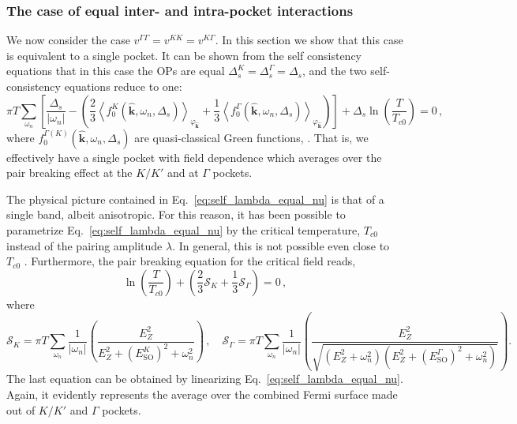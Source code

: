\documentclass[showpacs,superscriptaddress,onecolumn,prb]{revtex4}
\begin{document}
\subsubsection{The case of equal inter- and intra-pocket interactions} \label{sec:equal_amp}

We now consider the case $v^{\Gamma\Gamma}=v^{KK}=v^{K\Gamma}$. 
In this section we show that this case is equivalent to a single pocket. 
It can be shown from the self consistency equations that in this case the OPs are equal $\Delta_{s}^{K}=\Delta_{s}^{\Gamma}=\Delta_{s}$,
and the two self-consistency equations reduce to one:
\begin{equation}
\label{eq:self_lambda_equal_nu}
\pi T\underset{\omega_{n}}{\sum}\left[\frac{\Delta_{s}}{\left|\omega_{n}\right|}-\left(\frac{2}{3}\left\langle f_{0}^{K}\left(\hat{\mathbf{k}},\omega_{n},\Delta_{s}\right)\right\rangle _{\varphi_{\hat{\mathbf{k}}}}+\frac{1}{3}\left\langle f_{0}^{\Gamma}\left(\hat{\mathbf{k}},\omega_{n},\Delta_{s}\right)\right\rangle _{\varphi_{\hat{\mathbf{k}}}}\right)\right]+\Delta_{s}\ln\left(\frac{T}{T_{c0}}\right) =0\, ,
\end{equation}
where $f_{0}^{\Gamma(K)}\left(\hat{\mathbf{k}},\omega_{n},\Delta_{s}\right)$ are quasi-classical Green functions, \cite{haim2020signatures}. 
That is, we effectively have a single pocket with field
dependence which averages over the pair breaking effect at the $K/K'$ and at $\Gamma$ pockets.


The physical picture contained in Eq.~\eqref{eq:self_lambda_equal_nu} is that of a single band, albeit anisotropic.
For this reason, it has been possible to parametrize Eq.~\eqref{eq:self_lambda_equal_nu} by the critical temperature, $T_{c0}$ instead of the pairing amplitude $\lambda$.
In general, this is not possible even close to $T_{c0}$ \cite{Kogan2011}.
Furthermore, the pair breaking equation for the critical field reads,  
\begin{equation}
\label{eq:pair_breaking_lambda_equal_nu}
\ln\left(\frac{T}{T_{c0}}\right)+\left(\frac{2}{3}\mathcal{S}_{K}+\frac{1}{3}\mathcal{S}_{\Gamma}\right)=0\, , 
\end{equation}
where
\begin{equation}
\label{eq:SKG}
\mathcal{S}_{K}=\pi T\underset{\omega_{n}}{\sum}\frac{1}{\left|\omega_{n}\right|}\left(\frac{E_{Z}^{2}}{E_{Z}^{2}+\left(E_{\mathrm{SO}}^{K}\right)^{2}+\omega_{n}^{2}}\right)\, ,\quad 
\mathcal{S}_{\Gamma}=\pi T\underset{\omega_{n}}{\sum}\frac{1}{\left|\omega_{n}\right|}\left(\frac{E_{Z}^{2}}{\sqrt{\left(E_{Z}^{2}+\omega_{n}^{2}\right)\left(E_{Z}^{2}+\left(E_{\mathrm{SO}}^{\Gamma}\right)^{2}+\omega_{n}^{2}\right)}}\right).
\end{equation}
The last equation can be obtained by linearizing Eq.~\eqref{eq:self_lambda_equal_nu}.
Again, it evidently represents the average over the combined Fermi surface made out of $K/K'$ and $\Gamma$ pockets.
\end{document}
